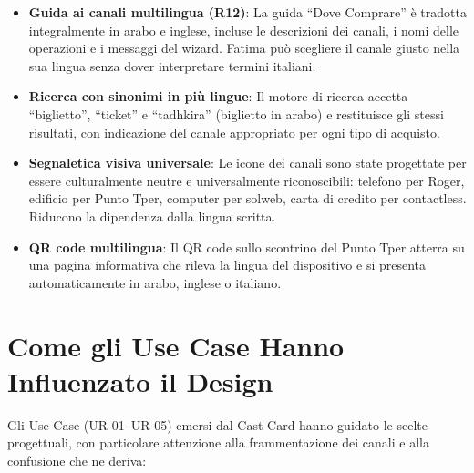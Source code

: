 \documentclass[11pt,a4paper]{article}
\begin{document}
\begin{itemize}
    \item \textbf{Guida ai canali multilingua (R12)}: La guida ``Dove Comprare'' \`e tradotta integralmente in arabo e inglese, incluse le descrizioni dei canali, i nomi delle operazioni e i messaggi del wizard. Fatima pu\`o scegliere il canale giusto nella sua lingua senza dover interpretare termini italiani.
    \item \textbf{Ricerca con sinonimi in pi\`u lingue}: Il motore di ricerca accetta ``biglietto'', ``ticket'' e ``tadhkira'' (biglietto in arabo) e restituisce gli stessi risultati, con indicazione del canale appropriato per ogni tipo di acquisto.
    \item \textbf{Segnaletica visiva universale}: Le icone dei canali sono state progettate per essere culturalmente neutre e universalmente riconoscibili: telefono per Roger, edificio per Punto Tper, computer per solweb, carta di credito per contactless. Riducono la dipendenza dalla lingua scritta.
    \item \textbf{QR code multilingua}: Il QR code sullo scontrino del Punto Tper atterra su una pagina informativa che rileva la lingua del dispositivo e si presenta automaticamente in arabo, inglese o italiano.
\end{itemize}

\vspace{0.3cm}

\section{Come gli Use Case Hanno Influenzato il Design}

Gli Use Case (UR-01--UR-05) emersi dal Cast Card hanno guidato le scelte progettuali, con particolare attenzione alla frammentazione dei canali e alla confusione che ne deriva:
\end{document}
